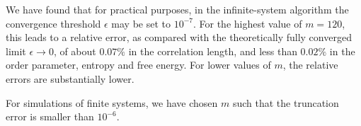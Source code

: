 We have found that for practical purposes, in the infinite-system algorithm the convergence threshold $\epsilon$ may be
set to $10^{-7}$.
For the highest value of $m = 120$, this leads to a relative error,
as compared with the theoretically fully converged limit $\epsilon \to 0$,
of about $0.07\%$ in the correlation length, and less than $0.02\%$ in the order parameter,
entropy and free energy.
For lower values of $m$, the relative errors are substantially lower.

For simulations of finite systems, we have chosen $m$ such that the truncation error is smaller than $10^{-6}$.
